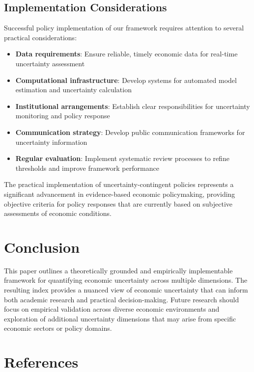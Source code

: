 \documentclass[5p,authoryear]{elsarticle}
\begin{document}
\subsection{Implementation Considerations}

Successful policy implementation of our framework requires attention to several practical considerations:

\begin{itemize}
    \item \textbf{Data requirements}: Ensure reliable, timely economic data for real-time uncertainty assessment
    \item \textbf{Computational infrastructure}: Develop systems for automated model estimation and uncertainty calculation
    \item \textbf{Institutional arrangements}: Establish clear responsibilities for uncertainty monitoring and policy response
    \item \textbf{Communication strategy}: Develop public communication frameworks for uncertainty information
    \item \textbf{Regular evaluation}: Implement systematic review processes to refine thresholds and improve framework performance
\end{itemize}

The practical implementation of uncertainty-contingent policies represents a significant advancement in evidence-based economic policymaking, providing objective criteria for policy responses that are currently based on subjective assessments of economic conditions.

\section{Conclusion}

This paper outlines a theoretically grounded and empirically implementable framework for quantifying economic uncertainty across multiple dimensions. The resulting index provides a nuanced view of economic uncertainty that can inform both academic research and practical decision-making. Future research should focus on empirical validation across diverse economic environments and exploration of additional uncertainty dimensions that may arise from specific economic sectors or policy domains.

\pagebreak
\section*{References} \label{sec:references}
\renewcommand{\bibsection}{}


\pagebreak
\end{document}
